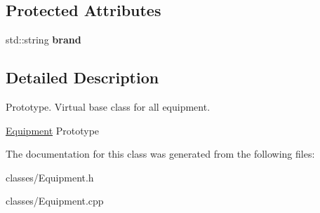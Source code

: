 \subsection*{Protected Attributes}
\begin{DoxyCompactItemize}
\item 
\hypertarget{class_equipment_ac92b9e665801fbf45368c11470631d26}{}std\+::string {\bfseries brand}\label{class_equipment_ac92b9e665801fbf45368c11470631d26}

\end{DoxyCompactItemize}


\subsection{Detailed Description}
Prototype. Virtual base class for all equipment.

\hyperlink{class_equipment}{Equipment} Prototype 

The documentation for this class was generated from the following files\+:\begin{DoxyCompactItemize}
\item 
classes/Equipment.\+h\item 
classes/Equipment.\+cpp\end{DoxyCompactItemize}
